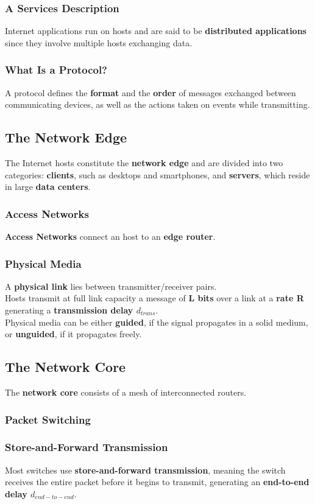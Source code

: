 \documentclass{article}
\begin{document}
\subsubsection{A Services Description}
Internet applications run on hosts and are said to be \textbf{distributed applications} since they involve multiple hosts exchanging data.
\subsubsection{What Is a Protocol?}
A protocol defines the \textbf{format} and the \textbf{order} of messages exchanged between communicating devices, as well as the actions taken on events while transmitting.

\subsection{The Network Edge}
The Internet hosts constitute the \textbf{network edge} and are divided into two categories: \textbf{clients}, such as desktops and smartphones, and \textbf{servers}, which reside in large \textbf{data centers}.
\subsubsection{Access Networks}
\textbf{Access Networks} connect an host to an \textbf{edge router}. 
\newpage
\subsubsection{Physical Media}
A \textbf{physical link} lies between transmitter/receiver pairs. \\
Hosts transmit at full link capacity a message of \textbf{L bits} over a link at a \textbf{rate R} generating a \textbf{transmission delay $ d_{trans} $}. \\
Physical media can be either \textbf{guided}, if the signal propagates in a solid medium, or \textbf{unguided}, if it propagates freely.

\subsection{The Network Core}
The \textbf{network core} consists of a mesh of interconnected routers.
\subsubsection{Packet Switching}
\subsubsection*{Store-and-Forward Transmission}
Most switches use \textbf{store-and-forward transmission}, meaning the switch receives the entire packet before it begins to transmit, generating an \textbf{end-to-end delay $ d_{end-to-end} $}.
\end{document}
